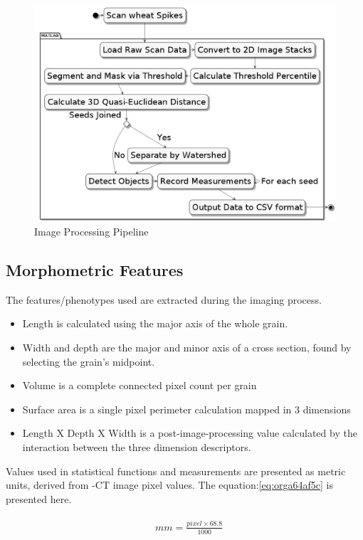 \documentclass[11pt]{report}
\begin{document}
\begin{figure}[htbp]
\centering
\includegraphics[width=15cm]{./images/matlab.png}
\caption{\label{fig:org07f628b}
Image Processing Pipeline}
\end{figure}

\subsection{Morphometric Features}
\label{sec:org8af53b4}

The features/phenotypes used are extracted during the imaging process.
\begin{itemize}
\item Length is calculated using the major axis of the whole grain.
\item Width and depth are the major and minor axis of a cross section, found by selecting the grain's midpoint.
\item Volume is a complete connected pixel count per grain
\item Surface area is a single pixel perimeter calculation mapped in 3 dimensions
\item Length X Depth X Width is a post-image-processing value calculated by the interaction between the three dimension descriptors.
\end{itemize}

Values used in statistical functions and measurements are presented as metric units, derived from \textmu{}-CT image pixel values. The equation:\ref{eq:orga64af5c} is presented here.

\begin{align}
\label{eq:orga64af5c}
  &\begin{aligned}
mm = \frac{pixel \times 68.8}{1000}
  \end{aligned}
\end{align}
\end{document}
